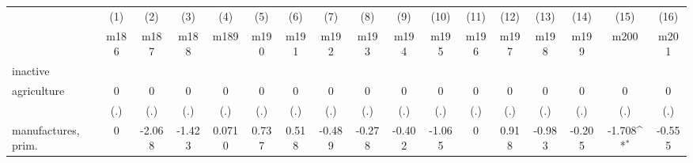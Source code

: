 {
\def\sym#1{\ifmmode^{#1}\else\(^{#1}\)\fi}
\begin{tabular}{l*{16}{c}}
\hline\hline
                    &\multicolumn{1}{c}{(1)}&\multicolumn{1}{c}{(2)}&\multicolumn{1}{c}{(3)}&\multicolumn{1}{c}{(4)}&\multicolumn{1}{c}{(5)}&\multicolumn{1}{c}{(6)}&\multicolumn{1}{c}{(7)}&\multicolumn{1}{c}{(8)}&\multicolumn{1}{c}{(9)}&\multicolumn{1}{c}{(10)}&\multicolumn{1}{c}{(11)}&\multicolumn{1}{c}{(12)}&\multicolumn{1}{c}{(13)}&\multicolumn{1}{c}{(14)}&\multicolumn{1}{c}{(15)}&\multicolumn{1}{c}{(16)}\\
                    &\multicolumn{1}{c}{m186}&\multicolumn{1}{c}{m187}&\multicolumn{1}{c}{m188}&\multicolumn{1}{c}{m189}&\multicolumn{1}{c}{m190}&\multicolumn{1}{c}{m191}&\multicolumn{1}{c}{m192}&\multicolumn{1}{c}{m193}&\multicolumn{1}{c}{m194}&\multicolumn{1}{c}{m195}&\multicolumn{1}{c}{m196}&\multicolumn{1}{c}{m197}&\multicolumn{1}{c}{m198}&\multicolumn{1}{c}{m199}&\multicolumn{1}{c}{m200}&\multicolumn{1}{c}{m201}\\
\hline
inactive            &                     &                     &                     &                     &                     &                     &                     &                     &                     &                     &                     &                     &                     &                     &                     &                     \\
agriculture         &           0         &           0         &           0         &           0         &           0         &           0         &           0         &           0         &           0         &           0         &           0         &           0         &           0         &           0         &           0         &           0         \\
                    &         (.)         &         (.)         &         (.)         &         (.)         &         (.)         &         (.)         &         (.)         &         (.)         &         (.)         &         (.)         &         (.)         &         (.)         &         (.)         &         (.)         &         (.)         &         (.)         \\
[1em]
manufactures, prim. &           0         &      -2.068         &      -1.423         &      0.0710         &       0.737         &       0.518         &      -0.489         &      -0.278         &      -0.402         &      -1.065         &           0         &       0.918         &      -0.983         &      -0.205         &      -1.708\sym{*}  &      -0.555         \\

\end{tabular}}
